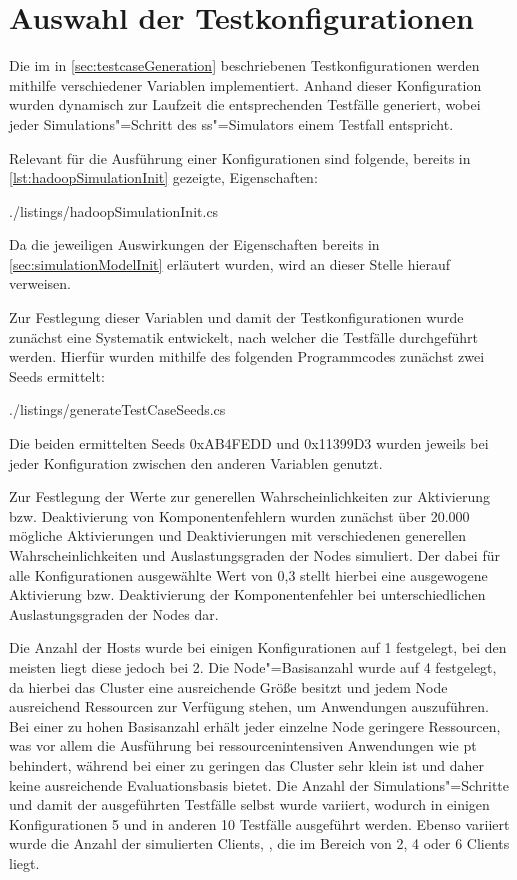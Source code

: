 \section{Auswahl der Testkonfigurationen}
\label{sec:selectTestcases}

Die im in \autoref{sec:testcaseGeneration} beschriebenen Testkonfigurationen werden mithilfe verschiedener Variablen implementiert.
Anhand dieser Konfiguration wurden dynamisch zur Laufzeit die entsprechenden Testfälle generiert, wobei jeder Simulations"=Schritt des \ac{ss}"=Simulators einem Testfall entspricht.

Relevant für die Ausführung einer Konfigurationen sind folgende, bereits in \autoref{lst:hadoopSimulationInit} gezeigte, Eigenschaften:


{./listings/hadoopSimulationInit.cs}

Da die jeweiligen Auswirkungen der Eigenschaften bereits in \autoref{sec:simulationModelInit} erläutert wurden, wird an dieser Stelle hierauf verweisen.

Zur Festlegung dieser Variablen und damit der Testkonfigurationen wurde zunächst eine Systematik entwickelt, nach welcher die Testfälle durchgeführt werden.
Hierfür wurden mithilfe des folgenden Programmcodes zunächst zwei Seeds ermittelt:


{./listings/generateTestCaseSeeds.cs}

Die beiden ermittelten Seeds 0xAB4FEDD und 0x11399D3 wurden jeweils bei jeder Konfiguration zwischen den anderen Variablen genutzt.

Zur Festlegung der Werte zur generellen Wahrscheinlichkeiten zur Aktivierung bzw. Deaktivierung von Komponentenfehlern wurden zunächst über 20.000 mögliche Aktivierungen und Deaktivierungen mit verschiedenen generellen Wahrscheinlichkeiten und Auslastungsgraden der Nodes simuliert.
Der dabei für alle Konfigurationen ausgewählte Wert von 0,3 stellt hierbei eine ausgewogene Aktivierung bzw. Deaktivierung der Komponentenfehler bei unterschiedlichen Auslastungsgraden der Nodes dar.

Die Anzahl der Hosts wurde bei einigen Konfigurationen auf 1 festgelegt, bei den meisten liegt diese jedoch bei 2.
Die Node"=Basisanzahl wurde auf 4 festgelegt, da hierbei das Cluster eine ausreichende Größe besitzt und jedem Node ausreichend Ressourcen zur Verfügung stehen, um Anwendungen auszuführen.
Bei einer zu hohen Basisanzahl erhält jeder einzelne Node geringere Ressourcen, was vor allem die Ausführung bei ressourcenintensiven Anwendungen wie \zB \acl{pt} behindert, während bei einer zu geringen das Cluster sehr klein ist und daher keine ausreichende Evaluationsbasis bietet.
Die Anzahl der Simulations"=Schritte und damit der ausgeführten Testfälle selbst wurde variiert, wodurch in einigen Konfigurationen 5 und in anderen 10 Testfälle ausgeführt werden.
Ebenso variiert wurde die Anzahl der simulierten Clients, , die im Bereich von 2, 4 oder 6 Clients liegt.

